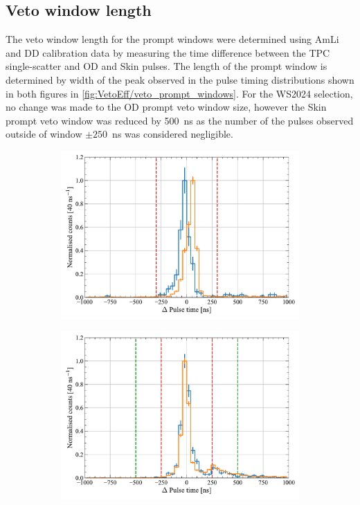 \subsection{Veto window length}
The veto window length for the prompt windows were determined using AmLi and DD calibration data by measuring the time difference between the TPC single-scatter and OD and Skin pulses. The length of the prompt window is determined by width of the peak observed in the pulse timing distributions shown in both figures in \autoref{fig:VetoEff/veto_prompt_windows}. For the WS2024 selection, no change was made to the OD prompt veto window size, however the Skin prompt veto window was reduced by 500~ns as the number of the pulses observed outside of window $\pm250$~ns was considered negligible.
\begin{figure}[!ht]
	\centering
	\begin{subfigure}[b]{0.49\textwidth}
		\centering
		\includegraphics[width=\textwidth]{figures/VetoEfficiency/ODpromptWindowTiming.pdf}
        \caption{}
		\label{fig:VetoEff/od_prompt_window}
	\end{subfigure}
	\hfill
	\begin{subfigure}[b]{0.49\textwidth}
		\centering
		\includegraphics[width=\textwidth]{figures/VetoEfficiency/SkinpromptWindowTiming.pdf}

\end{subfigure}
\end{figure}

